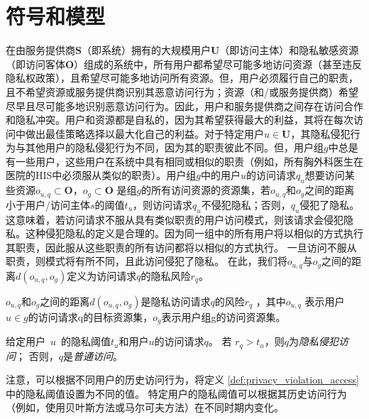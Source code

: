 \section{符号和模型}
\label{sec:notations}


在由服务提供商$\mathbf{S}$（即系统）拥有的大规模用户$\mathbf{U}$（即访问主体）和隐私敏感资源（即访问客体$\mathbf{O}$）组成的系统中，所有用户都希望尽可能多地访问资源（甚至违反隐私权政策），且希望尽可能多地访问所有资源。但，用户必须履行自己的职责，且不希望资源或服务提供商识别其恶意访问行为；资源（和/或服务提供商）希望尽早且尽可能多地识别恶意访问行为。因此，用户和服务提供商之间存在访问合作和隐私冲突。用户和资源都是自私的，因为其希望获得最大的利益，其将在每次访问中做出最佳策略选择以最大化自己的利益。对于特定用户$u \in \mathbf{U}$，其隐私侵犯行为与其他用户的隐私侵犯行为不同，因为其的职责彼此不同。但，用户组$g$中总是有一些用户，这些用户在系统中具有相同或相似的职责（例如，所有胸外科医生在医院的HIS中必须服从类似的职责）。用户组$g$中的用户$u$的访问请求$q_u$想要访问某些资源$o_{u,q} \subset \mathbf{O}$，$o_{g} \subset \mathbf{O}$ 是组$g$的所有访问资源的资源集，若$o_{u,q}$和$o_{g}$之间的距离小于用户/访问主体$s$的阈值$t_u$，则访问请求$q_u$不侵犯隐私；否则，$q_u$侵犯了隐私。这意味着，若访问请求不服从具有类似职责的用户访问模式，则该请求会侵犯隐私。这种侵犯隐私的定义是合理的。因为同一组中的所有用户将以相似的方式执行其职责，因此服从这些职责的所有访问都将以相似的方式执行。 一旦访问不服从职责，则模式将有所不同，且此访问侵犯了隐私。 在此，我们将$o_{u,q}$与$o_{g}$之间的距离$d(o_{u,q},o_{g})$定义为访问请求$q$的隐私风险$r_q$。
\begin{definition}
	\label{def:privacy_risk}
	$o_{u,q}$和$o_{g}$之间的距离$d(o_{u,q},o_{g})$是隐私访问请求$q$的风险$r_q$ ，其中$o_{u,q}$ 表示用户$u \in g$的访问请求q的目标资源集，$o_{g}$表示用户组g的访问资源集。
\end{definition}

\begin{definition}
	\label{def:privacy_violation_access}
	
	给定用户~$u$~的隐私阈值$t_u$和用户$u$的访问请求$q$。 若 $r_q > t_u$，则$q$为\textit{隐私侵犯访问}； 否则，$q$是\textit{普通访问}。
\end{definition}



注意，可以根据不同用户的历史访问行为，将定义 \ref{def:privacy_violation_access}中的隐私阈值设置为不同的值。 特定用户的隐私阈值可以根据其历史访问行为（例如，使用贝叶斯方法或马尔可夫方法）在不同时期内变化。

